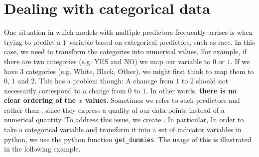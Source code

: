 \section{Dealing with categorical data}
 One situation in which models with multiple predictors frequently arrises is when trying to predict a $Y$ variable based on categorical predictors, such as race. In this case, we need to transform the categories  into numerical values. For example, if there are two categories (e.g. YES and NO) we map our variable to $0$ or $1$. If we have $3$ categories (e.g. White, Black, Other), we might first think to map them to $0$, $1$ and $2$. This has a problem though: A chancge from $1$ to $2$ should not necessarily  correspond to a change from $0$ to $1$. In other words, {\bf there is no clear ordering of the $x$ values}.  Sometimes we refer to such predictors and  rather than , since they express a quality of our data points instead of a numerical quantity. 
 To address this issue, we create . 
In particular, In order to take a categorical variable and transform it into a set of indicator variables in python, we use the python function \verb!get_dummies!. The usage of this is illustrated in the following example. 



